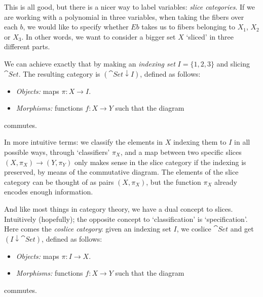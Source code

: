 This is all good, but there is a nicer way to label variables: \emph{slice categories}. If we are working with a polynomial in three variables, when taking the fibers over each $b$, we would like to specify whether $Eb$ takes us to fibers belonging to $X_1$, $X_2$ or $X_3$. In other words, we want to consider a bigger set $X$ `sliced' in three different parts.

We can achieve exactly that by making an \emph{indexing set} $I=\{1,2,3\}$ and slicing $\cat{Set}$. The resulting category is $(\cat{Set}\downarrow I)$, defined as follows:
\begin{itemize}
\item \emph{Objects:} maps $\pi:X\to I$.
\item \emph{Morphisms:} functions $f:X\to Y$ such that the diagram
\end{itemize}

\begin{figure}[!ht]
\centering
{}
\end{figure}
commutes.

In more intuitive terms: we classify the elements in $X$ indexing them to $I$ in all possible ways, through `classifiers' $\pi_X$, and a map between two specific slices $(X,\pi_X)\to(Y,\pi_Y)$ only makes sense in the slice category if the indexing is preserved, by means of the commutative diagram. The elements of the slice category can be thought of as pairs $(X,\pi_X)$, but the function $\pi_X$ already encodes enough information.

And like most things in category theory, we have a dual concept to slices. Intuitively (hopefully); the opposite concept to `classification' is `specification'. Here comes the \emph{coslice category}: given an indexing set $I$, we coslice $\cat{Set}$ and get $(I\downarrow\cat{Set})$, defined as follows:
\begin{itemize}
\item \emph{Objects:} maps $\pi:I\to X$.
\item \emph{Morphisms:} functions $f:X\to Y$ such that the diagram
\end{itemize}

\begin{figure}[!ht]
\centering
{}
\end{figure}
commutes.

